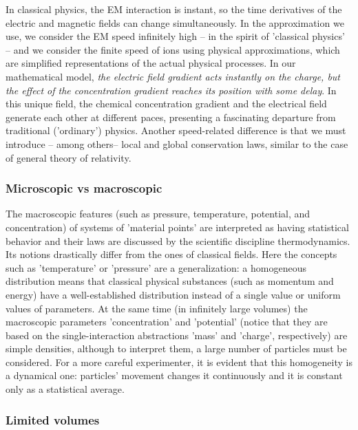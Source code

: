 In classical physics, the 
\gls{EM}
interaction is instant, so the time
derivatives of the electric and magnetic fields can change simultaneously.
In the approximation we use, we consider the 
\gls{EM}
speed infinitely
high -- in the spirit of 'classical physics' -- and
we consider the finite speed of ions using physical approximations,
which are simplified representations of the actual physical processes.
In our mathematical model, \emph{the electric field gradient acts
instantly on the charge, but the effect of the concentration gradient
reaches its position with some delay}.
In this unique field, the chemical
concentration gradient and the electrical field generate each other at different
paces, presenting a fascinating departure from traditional ('ordinary') physics.
Another speed-related difference is that we must introduce
-- among others-- local and global conservation laws,
similar to the case of general theory of relativity.


\subsubsection[Microscopic vs macroscopic]{Microscopic vs macroscopic\label{sec:Physics-Microscopic}}

The macroscopic features (such as pressure, temperature, 
potential, and concentration) of systems of 'material points'
are interpreted as having statistical
behavior and their laws are discussed by the scientific discipline
\hypertarget{Thermodynamics}{thermodynamics}.
Its notions drastically differ from the ones of
classical fields. 
Here the concepts such as 'temperature' or 'pressure' are a generalization: 
a homogeneous distribution means that classical physical substances 
(such as momentum and energy) have a well-established distribution
instead of a single value or uniform values of parameters. 
At the same time (in infinitely large volumes) the macroscopic parameters
'concentration' and 'potential' (notice that they are based on the single-interaction abstractions 'mass' and 'charge', respectively) are simple densities,
although to interpret them, a large number of particles must be considered.
For a more careful experimenter, it is evident that this homogeneity
is a dynamical one: particles' movement changes it continuously and 
it is constant only as a statistical average.

\subsubsection{Limited volumes\label{sec:Physics-ThermoLimited}}

